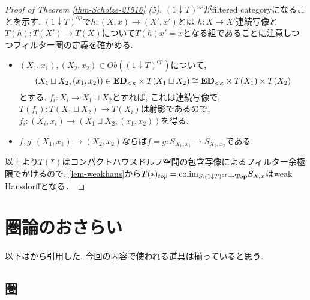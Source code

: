 \documentclass[dvipdfmx,a4paper,11pt]{article}
\newcommand{\colim}{{\rm colim}}
\theoremstyle{definition}
\begin{document}
\begin{proof}[Proof of Theorem \ref{thm-Scholze-21516} (5)]
 $ ( 1\downarrow T)^{op}$がfiltered categoryになることを示す. 
  $ ( 1\downarrow T)^{op}$で$h : (X,x) \to (X',x') $とは $h : X \to X'$連続写像と$T(h): T(X') \to T(X)$について$T(h)x' =x$となる組であることに注意しつつフィルター圏の定義を確かめる. 
 \begin{itemize}
\item $(X_1, x_1), (X_2,x_2) \in Ob(( 1\downarrow T)^{op})$について, 
$$(X_1 \sqcup X_2 , (x_1,x_2)) \in {\bf ED}_{<\kappa} \times T(X_1 \sqcup X_2) \cong {\bf ED}_{<\kappa} \times T(X_1) \times T(X_2)$$
とする.  
$f_i : X_i \to X_1 \sqcup X_2$とすれば, これは連続写像で, $T(f_i) : T(X_1 \sqcup X_2) \to T(X_i)$は射影であるので, $f_i : (X_i,x_i) \to (X_1 \sqcup X_2 , (x_1,x_2)) $を得る. 
\item $f, g : (X_1, x_1) \to (X_2,x_2) $ならば$f=g : S_{X_1, x_1} \to S_{X_2, x_2}$である.
\end{itemize}

以上より$T(\ast)$はコンパクトハウスドルフ空間の包含写像によるフィルター余極限でかけるので, \ref{lem-weakhaus}から$T(\ast)_{top} = \colim_{S : ( 1\downarrow T)^{op} \to {\bf Top}}S_{X,x}$はweak Hausdorffとなる．

\end{proof}







 
\newpage
\renewcommand{\thesection}{\Alph{section}} \setcounter{section}{0}


\section{圏論のおさらい}
以下は\cite{Mac}から引用した.
今回の内容で使われる道具は揃っていると思う. 

\subsection{圏}
\end{document}
